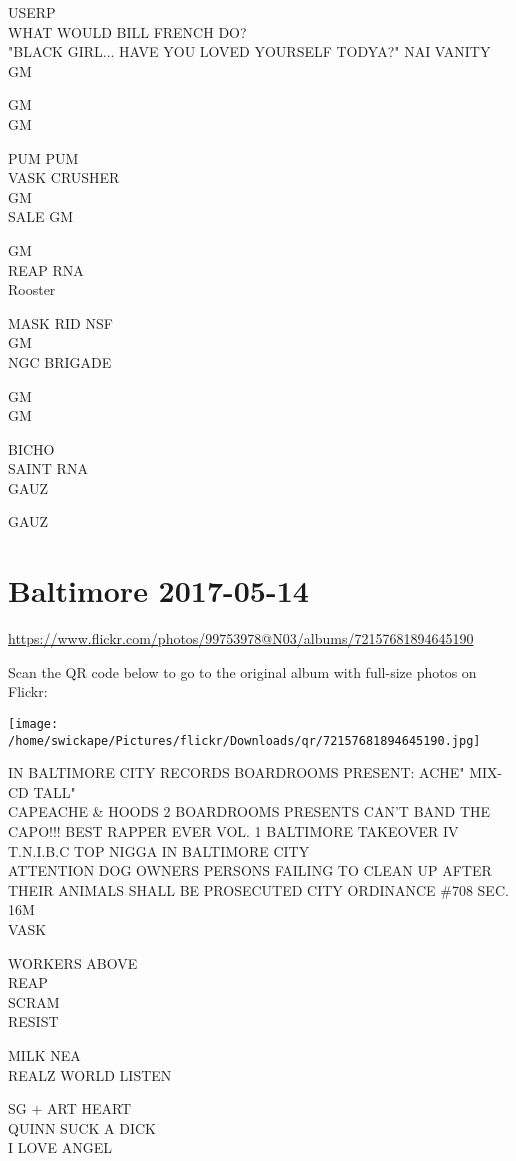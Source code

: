 \documentclass[10pt,letterpaper]{article}
\begin{document}
USERP\\
WHAT WOULD BILL FRENCH DO?\\
"BLACK GIRL... HAVE YOU LOVED YOURSELF TODYA?"  NAI VANITY\\
GM

GM\\
GM

PUM PUM\\
VASK CRUSHER\\
GM\\
SALE GM

GM\\
REAP RNA\\
Rooster

MASK RID NSF\\
GM\\
NGC BRIGADE

GM\\
GM

BICHO\\
SAINT RNA\\
GAUZ

GAUZ


\section*{Baltimore 2017-05-14}

\url{https://www.flickr.com/photos/99753978@N03/albums/72157681894645190}

Scan the QR code below to go to the original album with full-size photos on Flickr:

\texttt{[image: /home/swickape/Pictures/flickr/Downloads/qr/72157681894645190.jpg]}


IN BALTIMORE CITY RECORDS BOARDROOMS PRESENT: ACHE" MIX{-}CD TALL"\\
CAPEACHE \& HOODS 2 BOARDROOMS PRESENTS CAN'T BAND THE CAPO!!! BEST RAPPER EVER VOL. 1 BALTIMORE TAKEOVER IV T.N.I.B.C TOP NIGGA IN BALTIMORE CITY\\
ATTENTION DOG OWNERS PERSONS FAILING TO CLEAN UP AFTER THEIR ANIMALS SHALL BE PROSECUTED CITY ORDINANCE \#708 SEC. 16M\\
VASK

WORKERS ABOVE\\
REAP\\
SCRAM\\
RESIST

MILK NEA\\
REALZ WORLD LISTEN

SG + ART HEART\\
QUINN SUCK A DICK\\
I LOVE ANGEL
\end{document}
